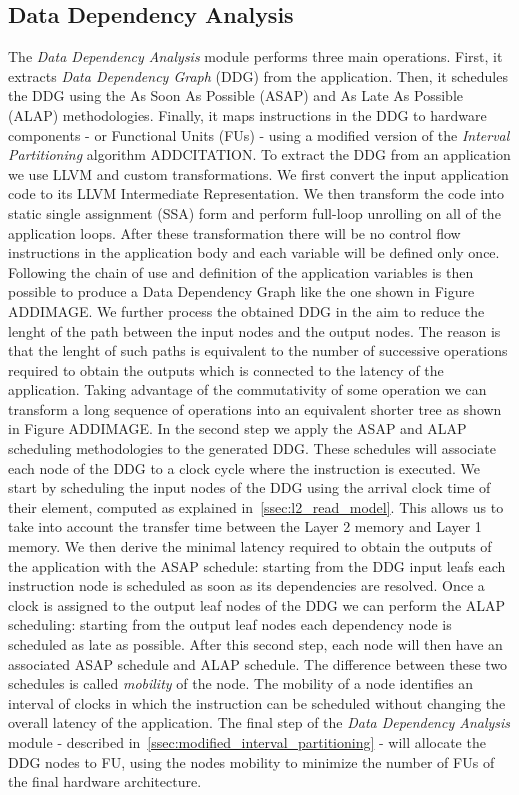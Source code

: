 \subsection{Data Dependency Analysis}
The \textit{Data Dependency Analysis} module performs three main operations. First, it extracts \textit{Data Dependency Graph} (DDG) from the application. Then, it schedules the DDG using the As Soon As Possible (ASAP) and As Late As Possible (ALAP) methodologies. Finally, it maps instructions in the DDG to hardware components - or Functional Units (FUs) - using a modified version of the \textit{Interval Partitioning} algorithm ADDCITATION.
To extract the DDG from an application we use LLVM  and custom transformations. We first convert the input application code to its LLVM Intermediate Representation. We then transform the code into static single assignment (SSA) form and perform full-loop unrolling on all of the application loops. After these transformation there will be no control flow instructions in the application body and each variable will be defined only once. Following the chain of use and definition of the application variables is then possible to produce a Data Dependency Graph like the one shown in Figure ADDIMAGE. 
We further process the obtained DDG in the aim to reduce the lenght of the path between the input nodes and the output nodes. The reason is that the lenght of such paths is equivalent to the number of successive operations required to obtain the outputs which is connected to the latency of the application. Taking advantage of the commutativity of some operation we can transform a long sequence of operations into an equivalent shorter tree as shown in Figure ADDIMAGE.
In the second step we apply the ASAP and ALAP scheduling methodologies to the generated DDG. These schedules will associate each node of the DDG to a clock cycle where the instruction is executed. We start by scheduling the input nodes of the DDG using the arrival clock time of their element, computed as explained in~\ref{ssec:l2_read_model}. This allows us to take into account the transfer time between the Layer 2 memory and Layer 1 memory. We then derive the minimal latency required to obtain the outputs of the application with the ASAP schedule: starting from the DDG input leafs each instruction node is scheduled as soon as its dependencies are resolved. 
Once a clock is assigned to the output leaf nodes of the DDG we can perform the ALAP scheduling: starting from the output leaf nodes each dependency node is scheduled as late as possible. After this second step, each node will then have an associated ASAP schedule and ALAP schedule. The difference between these two schedules is called \textit{mobility} of the node. The mobility of a node identifies an interval of clocks in which the instruction can be scheduled without changing the overall latency of the application.
The final step of the \textit{Data Dependency Analysis} module - described in~\ref{ssec:modified_interval_partitioning} - will allocate the DDG nodes to FU, using the nodes mobility to minimize the number of FUs of the final hardware architecture. 

